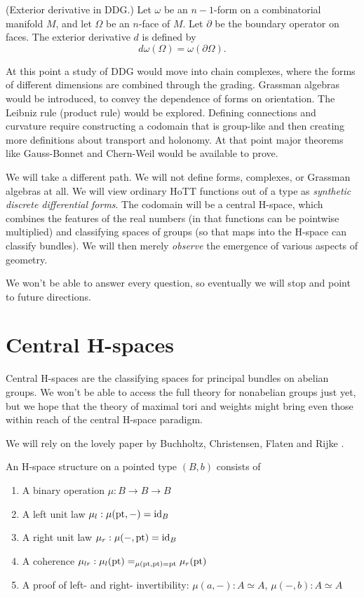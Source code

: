 \documentclass[12pt]{article}
\begin{document}
\begin{mydef}
(Exterior derivative in DDG.) Let \( \omega \) be an \( n-1 \)-form on a combinatorial manifold \( M \), and let \( \Omega \) be an \( n \)-face of \( M \). Let \( \partial \) be the boundary operator on faces. The exterior derivative \( d \) is defined by 
\[ 
 d\omega(\Omega) = \omega(\partial\Omega).
\]
\end{mydef}

At this point a study of DDG would move into chain complexes, where the forms of different dimensions are combined through the grading. Grassman algebras would be introduced, to convey the dependence of forms on orientation. The Leibniz rule (product rule) would be explored. Defining connections and curvature require constructing a codomain that is group-like and then creating more definitions about transport and holonomy. At that point major theorems like Gauss-Bonnet and Chern-Weil would be available to prove.

We will take a different path. We will not define forms, complexes, or Grassman algebras at all. We will view ordinary HoTT functions out of a type as \emph{synthetic discrete differential forms}. The codomain will be a central H-space, which combines the features of the real numbers (in that functions can be pointwise multiplied) and classifying spaces of groups (so that maps into the H-space can classify bundles). We will then merely \emph{observe} the emergence of various aspects of geometry.

We won't be able to answer every question, so eventually we will stop and point to future directions.

\section{Central H-spaces}

Central H-spaces are the classifying spaces for principal bundles on abelian groups. We won't be able to access the full theory for nonabelian groups just yet, but we hope that the theory of maximal tori and weights might bring even those within reach of the central H-space paradigm.

We will rely on the lovely paper by Buchholtz, Christensen, Flaten and Rijke \cite{buchholtz2023central}. 

\begin{mydef}
An H-space structure on a pointed type \( (B,b) \) consists of
\begin{enumerate}
\item A binary operation \( \mu:B\to B\to B \)
\item A left unit law \( \mu_l:\mu(\mathrm{pt},-)=\text{id}_B \)
\item A right unit law \( \mu_r:\mu(-,\mathrm{pt})=\text{id}_B \)
\item A coherence \( \mu_{lr}:\mu_l(\mathrm{pt})=_{\mu(\mathrm{pt},\mathrm{pt})=\mathrm{pt}}\mu_r(\mathrm{pt}) \)
\item A proof of left- and right- invertibility: \( \mu(a,-):A\simeq A \), \( \mu(-, b):A\simeq A \)
\end{enumerate}
\end{mydef}
\end{document}
